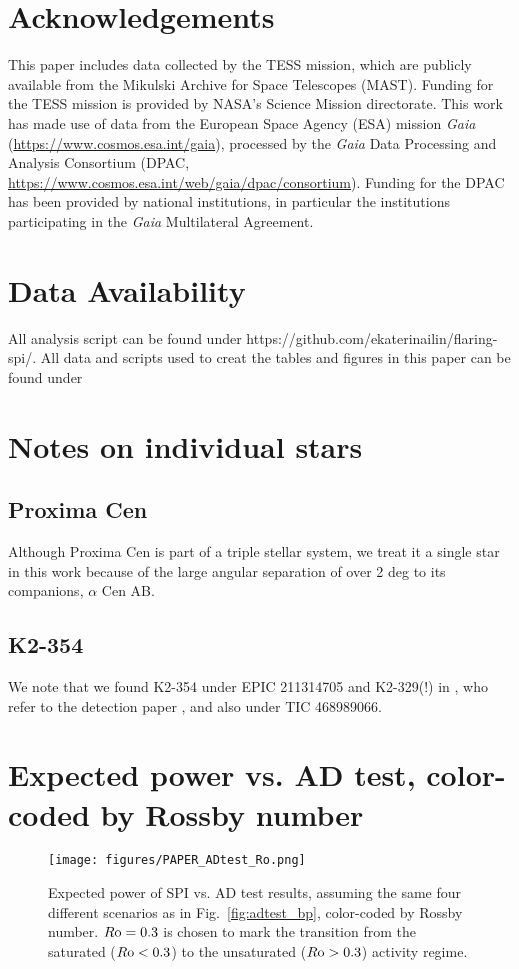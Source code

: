 \documentclass[twocolumn]{aastex631}
\begin{document}
\section*{Acknowledgements}
This paper includes data collected by the TESS mission, which are publicly available from the Mikulski Archive for Space Telescopes (MAST).
Funding for the TESS mission is provided by NASA’s Science Mission directorate. 
This work has made use of data from the European Space Agency (ESA) mission {\it Gaia} (\url{https://www.cosmos.esa.int/gaia}), processed by the {\it Gaia} Data Processing and Analysis Consortium (DPAC, \url{https://www.cosmos.esa.int/web/gaia/dpac/consortium}). Funding for the DPAC
has been provided by national institutions, in particular the institutions participating in the {\it Gaia} Multilateral Agreement.
\section*{Data Availability}
All analysis script can be found under https://github.com/ekaterinailin/flaring-spi/. All data and scripts used to creat the tables and figures in this paper can be found under



\appendix
\section{Notes on individual stars}
\subsection{Proxima Cen}
Although Proxima Cen is part of a triple stellar system, we treat it a single star in this work because of the large angular separation of over 2 deg to its companions, $\alpha$ Cen AB.

\subsection{K2-354}
We note that we found K2-354 under EPIC 211314705 and K2-329(!) in \cite{bouma2020cluster}, who refer to the detection paper \cite{pope2016transiting}, and also under TIC 468989066.

\section{Expected power vs. AD test, color-coded by Rossby number}
\begin{figure*}[ht!]
    \begin{centering}
        \texttt{[image: figures/PAPER\_ADtest\_Ro.png]}
        \caption{
        Expected power of SPI vs. AD test results, assuming the same four different scenarios as in Fig.~\ref{fig:adtest_bp}, color-coded by Rossby number. $R\rm o=0.3$ is chosen to mark the transition from the saturated ($R\rm o < 0.3$) to the unsaturated ($R\rm o > 0.3$) activity regime. 
        }
        \label{fig:adtest_ro}
    \end{centering}
\end{figure*}
\end{document}
